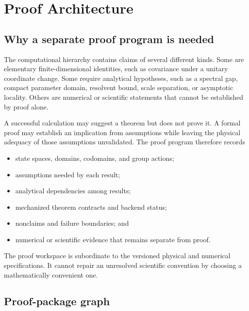 \chapter{Proof Architecture}

\label{ch:proof-program}



\section{Why a separate proof program is needed}

The computational hierarchy contains claims of several different kinds. Some
are elementary finite-dimensional identities, such as covariance under a
unitary coordinate change. Some require analytical hypotheses, such as a
spectral gap, compact parameter domain, resolvent bound, scale separation, or
asymptotic locality. Others are numerical or scientific statements that cannot
be established by proof alone.

A successful calculation may suggest a theorem but does not prove it. A formal
proof may establish an implication from assumptions while leaving the physical
adequacy of those assumptions unvalidated. The proof program therefore records

\begin{itemize}
  \item state spaces, domains, codomains, and group actions;
  \item assumptions needed by each result;
  \item analytical dependencies among results;
  \item mechanized theorem contracts and backend status;
  \item nonclaims and failure boundaries; and
  \item numerical or scientific evidence that remains separate from proof.
\end{itemize}

The proof workspace is subordinate to the versioned physical and numerical
specifications. It cannot repair an unresolved scientific convention by
choosing a mathematically convenient one.

\section{Proof-package graph}


